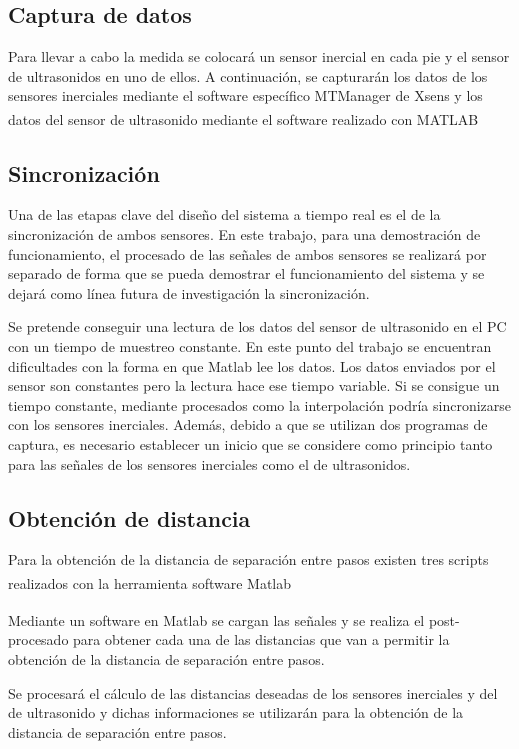 \subsection{Captura de datos}

Para llevar a cabo la medida se colocará un sensor inercial en cada pie y el sensor de ultrasonidos en uno de ellos. A continuación, se capturarán los datos de los sensores inerciales mediante el software específico MTManager de Xsens y los datos del sensor de ultrasonido mediante el software realizado con MATLAB\textsuperscript{\textregistered} 


\subsection{Sincronización}
Una de las etapas clave del diseño del sistema a tiempo real es el de la sincronización de ambos sensores. En este trabajo, para una demostración de funcionamiento, el procesado de las señales de ambos sensores se realizará por separado de forma que se pueda demostrar el funcionamiento del sistema y se dejará como línea futura de investigación la sincronización. 

Se pretende conseguir una lectura de los datos del sensor de ultrasonido en el PC con un tiempo de muestreo constante. En este punto del trabajo se encuentran dificultades con la forma en que Matlab lee los datos. Los datos enviados por el sensor son constantes pero la lectura hace ese tiempo variable. Si se consigue un tiempo constante, mediante procesados como la interpolación podría sincronizarse con los sensores inerciales. Además, debido a que se utilizan dos programas de captura, es necesario establecer un inicio que se considere como principio tanto para las señales de los sensores inerciales como el de ultrasonidos. 


\subsection{Obtención de distancia}
Para la obtención de la distancia de separación entre pasos existen tres scripts realizados con la herramienta software Matlab\textsuperscript{\textregistered}

Mediante un software en Matlab\textsuperscript{\textregistered} se cargan las señales y se realiza el post-procesado para obtener cada una de las distancias que van a permitir la obtención de la distancia de separación entre pasos.

Se procesará el cálculo de las distancias deseadas de los sensores inerciales y del de ultrasonido y dichas informaciones se utilizarán para la obtención de la distancia de separación entre pasos.

